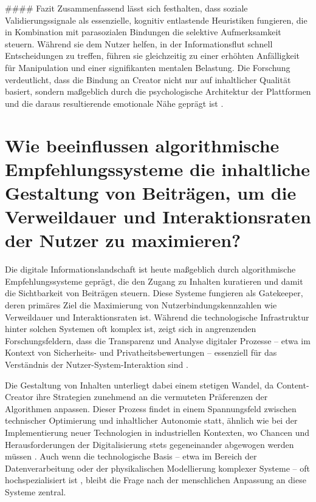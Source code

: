 \documentclass[11pt,a4paper]{article}
\begin{document}
\#\#\#\# Fazit Zusammenfassend lässt sich festhalten, dass soziale Validierungssignale als essenzielle, kognitiv entlastende Heuristiken fungieren, die in Kombination mit parasozialen Bindungen die selektive Aufmerksamkeit steuern. Während sie dem Nutzer helfen, in der Informationsflut schnell Entscheidungen zu treffen, führen sie gleichzeitig zu einer erhöhten Anfälligkeit für Manipulation und einer signifikanten mentalen Belastung. Die Forschung verdeutlicht, dass die Bindung an Creator nicht nur auf inhaltlicher Qualität basiert, sondern maßgeblich durch die psychologische Architektur der Plattformen und die daraus resultierende emotionale Nähe geprägt ist \autocite{grey_grey_5d5c282590c448fc8776b04f78a08de5,grey_grey_d4bc9c0d0e8441ba90398520e73af07d}.

\section{Wie beeinflussen algorithmische Empfehlungssysteme die inhaltliche Gestaltung von Beiträgen, um die Verweildauer und Interaktionsraten der Nutzer zu maximieren?}

Die digitale Informationslandschaft ist heute maßgeblich durch algorithmische Empfehlungssysteme geprägt, die den Zugang zu Inhalten kuratieren und damit die Sichtbarkeit von Beiträgen steuern. Diese Systeme fungieren als Gatekeeper, deren primäres Ziel die Maximierung von Nutzerbindungskennzahlen wie Verweildauer und Interaktionsraten ist. Während die technologische Infrastruktur hinter solchen Systemen oft komplex ist, zeigt sich in angrenzenden Forschungsfeldern, dass die Transparenz und Analyse digitaler Prozesse – etwa im Kontext von Sicherheits- und Privatheitsbewertungen – essenziell für das Verständnis der Nutzer-System-Interaktion sind \autocite{arxiv_1705_08889}.

Die Gestaltung von Inhalten unterliegt dabei einem stetigen Wandel, da Content-Creator ihre Strategien zunehmend an die vermuteten Präferenzen der Algorithmen anpassen. Dieser Prozess findet in einem Spannungsfeld zwischen technischer Optimierung und inhaltlicher Autonomie statt, ähnlich wie bei der Implementierung neuer Technologien in industriellen Kontexten, wo Chancen und Herausforderungen der Digitalisierung stets gegeneinander abgewogen werden müssen \autocite{arxiv_1709_01020}. Auch wenn die technologische Basis – etwa im Bereich der Datenverarbeitung oder der physikalischen Modellierung komplexer Systeme – oft hochspezialisiert ist \autocite{arxiv_1912_05973,arxiv_1912_05975,arxiv_2509_08841}, bleibt die Frage nach der menschlichen Anpassung an diese Systeme zentral.
\end{document}
